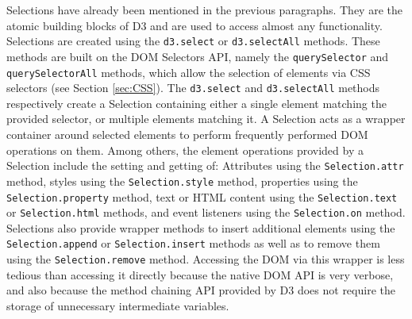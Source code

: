 Selections have already been mentioned in the previous paragraphs.
They are the atomic building blocks of D3 and are used to access almost any functionality.
Selections are created using the \lstinline{d3.select} or \lstinline{d3.selectAll} methods.
These methods are built on the DOM Selectors API, namely the \lstinline{querySelector} and \lstinline{querySelectorAll} methods, which allow the selection of elements via CSS selectors (see Section \ref{sec:CSS}).
The \lstinline{d3.select} and \lstinline{d3.selectAll} methods respectively create a Selection containing either a single element matching the provided selector, or multiple elements matching it.
A Selection acts as a wrapper container around selected elements to perform frequently performed DOM operations on them.
Among others, the element operations provided by a Selection include the setting and getting of: Attributes using the \lstinline{Selection.attr} method, styles using the \lstinline{Selection.style} method, properties using the \lstinline{Selection.property} method, text or HTML content using the \lstinline{Selection.text} or \lstinline{Selection.html} methods, and event listeners using the \lstinline{Selection.on} method.
Selections also provide wrapper methods to insert additional elements using the \lstinline{Selection.append} or \lstinline{Selection.insert} methods as well as to remove them using the \lstinline{Selection.remove} method.
Accessing the DOM via this wrapper is less tedious than accessing it directly because the native DOM API is very verbose, and also because the method chaining API provided by D3 does not require the storage of unnecessary intermediate variables.


